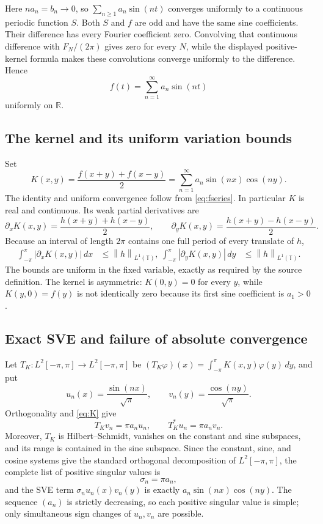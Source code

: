 \documentclass[11pt]{article}
\theoremstyle{remark}
\newcommand{\T}{\mathbb T}
\newcommand{\R}{\mathbb R}
\newcommand{\norm}[1]{\left\lVert#1\right\rVert}
\begin{document}
Here $n a_n=b_n\to0$, so $\sum_{n\geq1}a_n\sin(nt)$ converges uniformly to a
continuous periodic function $S$.  Both $S$ and $f$ are odd and have the same
sine coefficients.  Their difference has every Fourier coefficient zero.
Convolving that continuous difference with $F_N/(2\pi)$ gives zero for every
$N$, while the displayed positive-kernel formula makes these convolutions
converge uniformly to the difference.  Hence
\begin{equation}\label{eq:fseries}
 f(t)=\sum_{n=1}^{\infty}a_n\sin(nt)
\end{equation}
uniformly on $\R$.

\subsection{The kernel and its uniform variation bounds}

Set
\begin{equation}\label{eq:K}
 K(x,y)=\frac{f(x+y)+f(x-y)}2
 =\sum_{n=1}^{\infty}a_n\sin(nx)\cos(ny).
\end{equation}
The identity and uniform convergence follow from \eqref{eq:fseries}.  In
particular $K$ is real and continuous.  Its weak partial derivatives are
\[
 \partial_xK(x,y)=\frac{h(x+y)+h(x-y)}2,
 \qquad
 \partial_yK(x,y)=\frac{h(x+y)-h(x-y)}2.
\]
Because an interval of length $2\pi$ contains one full period of every
translate of $h$,
\begin{align*}
 \int_{-\pi}^{\pi}|\partial_xK(x,y)|\,dx&\leq\norm{h}_{L^1(\T)},\
 \int_{-\pi}^{\pi}|\partial_yK(x,y)|\,dy&\leq\norm{h}_{L^1(\T)}.
\end{align*}
The bounds are uniform in the fixed variable, exactly as required by the
source definition.  The kernel is asymmetric: $K(0,y)=0$ for every $y$, while
$K(y,0)=f(y)$ is not identically zero because its first sine coefficient is
$a_1>0$.

\subsection{Exact SVE and failure of absolute convergence}

Let $T_K:L^2[-\pi,\pi]\to L^2[-\pi,\pi]$ be
$(T_K\varphi)(x)=\int_{-\pi}^{\pi}K(x,y)\varphi(y)\,dy$, and put
\[
 u_n(x)=\frac{\sin(nx)}{\sqrt\pi},
 \qquad
 v_n(y)=\frac{\cos(ny)}{\sqrt\pi}.
\]
Orthogonality and \eqref{eq:K} give
\begin{equation}\label{eq:svd}
 T_Kv_n=\pi a_nu_n,
 \qquad
 T_K^*u_n=\pi a_nv_n.
\end{equation}
Moreover, $T_K$ is Hilbert--Schmidt, vanishes on the constant and sine
subspaces, and its range is contained in the sine subspace.  Since the
constant, sine, and cosine systems give the standard orthogonal decomposition
of $L^2[-\pi,\pi]$, the complete list of positive
singular values is
\[
 \sigma_n=\pi a_n,
\]
and the SVE term $\sigma_nu_n(x)v_n(y)$ is exactly
$a_n\sin(nx)\cos(ny)$.  The sequence $(a_n)$ is strictly decreasing, so each
positive singular value is simple; only simultaneous sign changes of
$u_n,v_n$ are possible.
\end{document}
